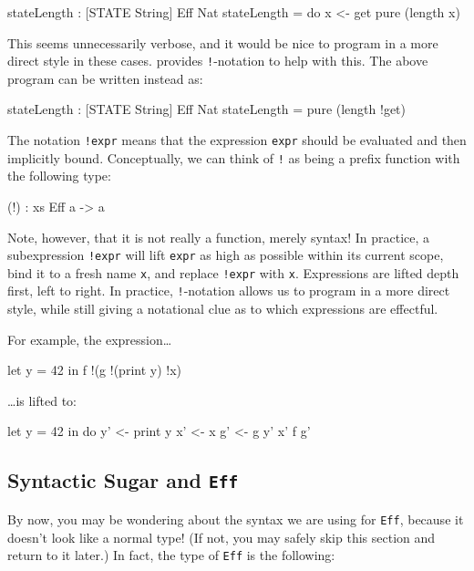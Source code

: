 \begin{code}
stateLength : { [STATE String] } Eff Nat
stateLength = do x <- get
                 pure (length x)
\end{code}

\noindent
This seems unnecessarily verbose, and it would be nice to program in a more
direct style in these cases. \Idris{} provides \texttt{!}-notation to help
with this. The above program can be written instead as:

\begin{code}
stateLength : { [STATE String] } Eff Nat
stateLength = pure (length !get)
\end{code}

\noindent
The notation \texttt{!expr} means that the expression \texttt{expr} should
be evaluated and then implicitly bound. Conceptually,
we can think of \texttt{!} as being a prefix function with the following type:

\begin{code}
(!) : { xs } Eff a -> a
\end{code}

\noindent
Note, however, that it is not really a function, merely syntax! In practice, a
subexpression \texttt{!expr} will lift \texttt{expr} as high as possible within
its current scope, bind it to a fresh name \texttt{x}, and replace
\texttt{!expr} with \texttt{x}. Expressions are lifted depth first, left to
right. In practice, \texttt{!}-notation allows us to program in a more direct
style, while still giving a notational clue as to which expressions are
effectful.

For example, the expression\ldots

\begin{code}
let y = 42 in f !(g !(print y) !x)
\end{code}

\ldots is lifted to:

\begin{code}
let y = 42 in do y' <- print y
                 x' <- x
                 g' <- g y' x'
                 f g'
\end{code}


\subsection{Syntactic Sugar and \texttt{Eff}}

By now, you may be wondering about the syntax we are using for \texttt{Eff},
because it doesn't look like a normal \Idris{} type! (If not, you may
safely skip this section and return to it later.) In fact, the type of
\texttt{Eff} is the following:

